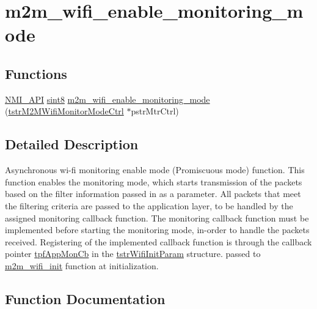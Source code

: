 \hypertarget{group__WifiEnableMonitorModeFn}{}\section{m2m\+\_\+wifi\+\_\+enable\+\_\+monitoring\+\_\+mode}
\label{group__WifiEnableMonitorModeFn}
\subsection*{Functions}
\begin{DoxyCompactItemize}
\item 
\hyperlink{group__BSPDefine_gaecc0323d771e41ef81a76b5f12783e22}{N\+M\+I\+\_\+\+A\+PI} \hyperlink{group__DataT_gae35f10ffd0ac8dd2bc3e794da9bdfbc7}{sint8} \hyperlink{group__WifiEnableMonitorModeFn_gac208f9fc4c1ac93d3fc3e8a81c3c2223}{m2m\+\_\+wifi\+\_\+enable\+\_\+monitoring\+\_\+mode} (\hyperlink{structtstrM2MWifiMonitorModeCtrl}{tstr\+M2\+M\+Wifi\+Monitor\+Mode\+Ctrl} $\ast$pstr\+Mtr\+Ctrl)
\end{DoxyCompactItemize}


\subsection{Detailed Description}
Asynchronous wi-\/fi monitoring enable mode (Promiscuous mode) function. This function enables the monitoring mode, which starts transmission of the packets based on the filter information passed in as a parameter. All packets that meet the filtering criteria are passed to the application layer, to be handled by the assigned monitoring callback function. The monitoring callback function must be implemented before starting the monitoring mode, in-\/order to handle the packets received. Registering of the implemented callback function is through the callback pointer \hyperlink{group__WlanEnums_ga8d2753e870245dad4932cee1777c6eb6}{tpf\+App\+Mon\+Cb} in the \hyperlink{structtstrWifiInitParam}{tstr\+Wifi\+Init\+Param} structure. passed to \hyperlink{group__WifiInitFn_ga73c734812e844d96d860c4e93e9daf35}{m2m\+\_\+wifi\+\_\+init} function at initialization. 

\subsection{Function Documentation}
\mbox{\label{group__WifiEnableMonitorModeFn_gac208f9fc4c1ac93d3fc3e8a81c3c2223}} 
